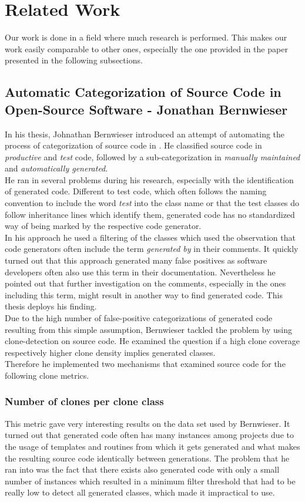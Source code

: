 \chapter{Related Work}\label{chapter:related}
Our work is done in a field where much research is performed. This makes our work easily comparable to other ones, especially the one provided in the paper presented in the following subsections.
\section{Automatic Categorization of Source Code in Open-Source Software - Jonathan Bernwieser}
In his thesis, Johnathan Bernwieser introduced an attempt of automating the process of categorization of source code in \cite{Bernwieser2014}. He classified source code in \textit{productive} and \textit{test} code, followed by a sub-categorization in \textit{manually maintained} and \textit{automatically generated}.\\
He ran in several problems during his research, especially with the identification of generated code. Different to test code, which often follows the naming convention to include the word \textit{test} into the class name or that the test classes do follow inheritance lines which identify them, generated code has no standardized way of being marked by the respective code generator.\\
In his approach he used a filtering of the classes which used the observation that code generators often include the term \textit{generated by} in their comments. It quickly turned out that this approach generated many false positives as software developers often also use this term in their documentation. Nevertheless he pointed out that further investigation on the comments, especially in the ones including this term, might result in another way to find generated code. This thesis deploys his finding. \\
Due to the high number of false-positive categorizations of generated code resulting from this simple assumption, Bernwieser tackled the problem by using clone-detection on source code. He examined the question if a high clone coverage respectively higher clone density implies generated classes.\\
Therefore he implemented two mechanisms that examined source code for the following clone metrics.

\subsection{Number of clones per clone class}
This metric gave very interesting results on the data set used by Bernwieser. It turned out that generated code often has many instances among projects due to the usage of templates and routines from which it gets generated and what makes the resulting source code identically between generations. The problem that he ran into was the fact that there exists also generated code with only a small number of instances which resulted in a minimum filter threshold that had to be really low to detect all generated classes, which made it impractical to use.

